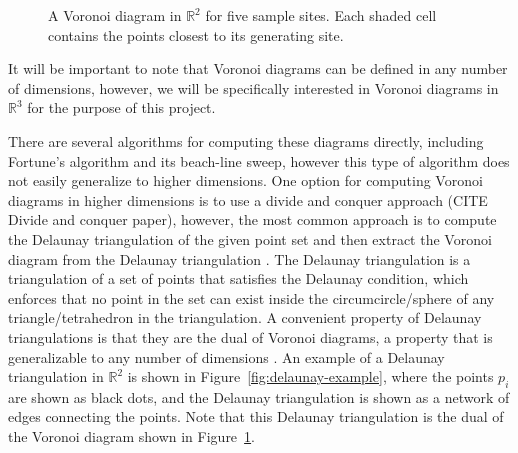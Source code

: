 \documentclass{article}
\begin{document}
\begin{figure}[H]
\centering
{}
\caption{A Voronoi diagram in $\mathbb{R}^2$ for five sample sites. Each shaded cell contains the points closest to its generating site.}
\label{fig:voronoi-example}
\end{figure}

It will be important to note that Voronoi diagrams can be defined in any number of dimensions, however, we will be specifically interested in Voronoi diagrams in $\mathbb{R}^3$ for the purpose of this project.

There are several algorithms for computing these diagrams directly, including Fortune's algorithm and its beach-line sweep, however this type of algorithm does not easily generalize to higher dimensions. One option for computing Voronoi diagrams in higher dimensions is to use a divide and conquer approach (CITE Divide and conquer paper), however, the most common approach is to compute the Delaunay triangulation of the given point set and then extract the Voronoi diagram from the Delaunay triangulation \cite{delaunay_to_voronoi}. The Delaunay triangulation is a triangulation of a set of points that satisfies the Delaunay condition, which enforces that no point in the set can exist inside the circumcircle/sphere of any triangle/tetrahedron in the triangulation. A convenient property of Delaunay triangulations is that they are the dual of Voronoi diagrams, a property that is generalizable to any number of dimensions \cite{delaunay_to_voronoi}. An example of a Delaunay triangulation in $\mathbb{R}^2$ is shown in Figure~\ref{fig:delaunay-example}, where the points $p_i$ are shown as black dots, and the Delaunay triangulation is shown as a network of edges connecting the points. Note that this Delaunay triangulation is the dual of the Voronoi diagram shown in Figure~\ref{fig:voronoi-example}.
\end{document}
